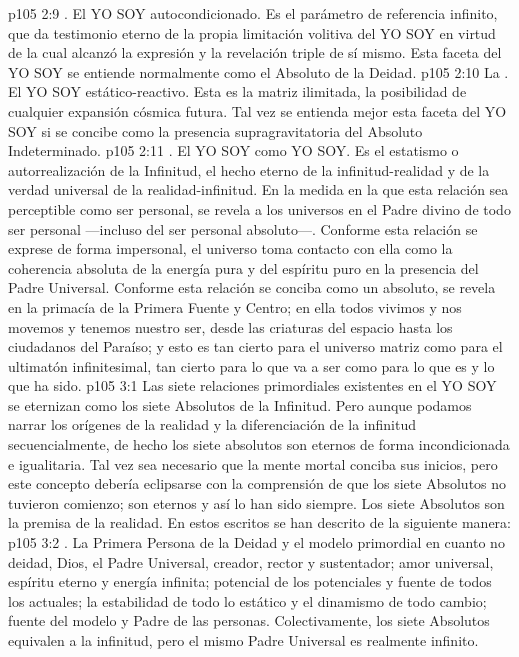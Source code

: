 \vs p105 2:9 . El YO SOY autocondicionado. Es el parámetro de referencia infinito, que da testimonio eterno de la propia limitación volitiva del YO SOY en virtud de la cual alcanzó la expresión y la revelación triple de sí mismo. Esta faceta del YO SOY se entiende normalmente como el Absoluto de la Deidad.
\vs p105 2:10 La . El YO SOY estático\hyp{}reactivo. Esta es la matriz ilimitada, la posibilidad de cualquier expansión cósmica futura. Tal vez se entienda mejor esta faceta del YO SOY si se concibe como la presencia supragravitatoria del Absoluto Indeterminado.
\vs p105 2:11 . El YO SOY como YO SOY. Es el estatismo o autorrealización de la Infinitud, el hecho eterno de la infinitud\hyp{}realidad y de la verdad universal de la realidad\hyp{}infinitud. En la medida en la que esta relación sea perceptible como ser personal, se revela a los universos en el Padre divino de todo ser personal ---incluso del ser personal absoluto---. Conforme esta relación se exprese de forma impersonal, el universo toma contacto con ella como la coherencia absoluta de la energía pura y del espíritu puro en la presencia del Padre Universal. Conforme esta relación se conciba como un absoluto, se revela en la primacía de la Primera Fuente y Centro; en ella todos vivimos y nos movemos y tenemos nuestro ser, desde las criaturas del espacio hasta los ciudadanos del Paraíso; y esto es tan cierto para el universo matriz como para el ultimatón infinitesimal, tan cierto para lo que va a ser como para lo que es y lo que ha sido.
\vs p105 3:1 Las siete relaciones primordiales existentes en el YO SOY se eternizan como los siete Absolutos de la Infinitud. Pero aunque podamos narrar los orígenes de la realidad y la diferenciación de la infinitud secuencialmente, de hecho los siete absolutos son eternos de forma incondicionada e igualitaria. Tal vez sea necesario que la mente mortal conciba sus inicios, pero este concepto debería eclipsarse con la comprensión de que los siete Absolutos no tuvieron comienzo; son eternos y así lo han sido siempre. Los siete Absolutos son la premisa de la realidad. En estos escritos se han descrito de la siguiente manera:
\vs p105 3:2 . La Primera Persona de la Deidad y el modelo primordial en cuanto no deidad, Dios, el Padre Universal, creador, rector y sustentador; amor universal, espíritu eterno y energía infinita; potencial de  los potenciales y fuente de todos los actuales; la estabilidad de todo lo estático y el dinamismo de todo cambio; fuente del modelo y Padre de las personas. Colectivamente, los siete Absolutos equivalen a la infinitud, pero el mismo Padre Universal es realmente infinito.
